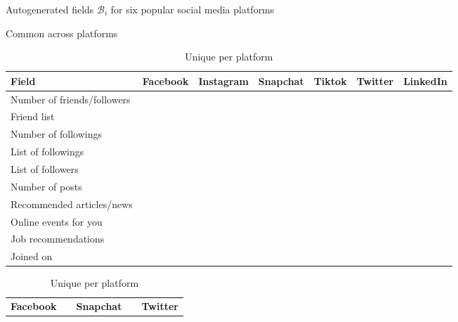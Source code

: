 \documentclass[11pt]{article} %
\newcommand{\cmark}{\ding{51}}%
\begin{document}
\begin{table}[tb]
\small
    \caption{Autogenerated fields $\mathcal{B}_i$ for six popular social media platforms}
    \label{tab:autogenerate}
    \begin{subtable}{\textwidth}
        \centering
        \caption{Common across platforms}
        \label{tab:autogenerate-a}
            \begin{tabular}{lcccccc} 
            \toprule
Field &   Facebook &   Instagram &   Snapchat &   Tiktok &   Twitter &   LinkedIn \\ \midrule    
Number of friends/followers & \cmark    & \cmark     &          & \cmark  & \cmark   & \cmark    \\\hline
Friend list                 & \cmark    &           &          &        &         & \cmark    \\\hline
Number of followings        & \cmark    & \cmark     &          & \cmark  & \cmark   &          \\\hline
List of followings          & \cmark    & \cmark     &          &        & \cmark   &          \\\hline
List of followers           &          & \cmark     &          &        & \cmark   &          \\\hline
Number of posts             &          & \cmark     &          &        & \cmark   &          \\\hline
Recommended articles/news   & \cmark    &           & \cmark    &        & \cmark   & \cmark    \\\hline
Online events for you       & \cmark    &           &          &        &         & \cmark    \\\hline
Job recommendations         & \cmark    &           &          &        &         & \cmark    \\\hline
Joined on                   &          &           & \cmark    &        & \cmark   &         \\ \bottomrule
            \end{tabular} 
    \end{subtable}%
    \vspace{1em}
    \begin{subtable}{\textwidth}
        \centering
        \caption{Unique per platform}
        \label{tab:autogenerate-b}
        \begin{tabular}{ccccc} 
\textbf{Facebook}                &  & \textbf{Snapchat}        &  & \textbf{Twitter}                     \\ \cline{1-1} \cline{3-3} \cline{5-5} 

\end{tabular}
\end{subtable}
\end{table}
\end{document}

